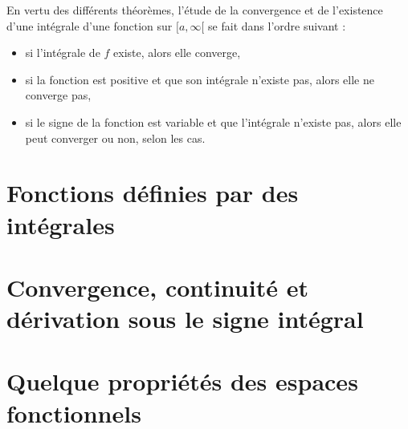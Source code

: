En vertu des différents théorèmes, l'étude de la convergence et de l'existence d'une intégrale d'une fonction sur $[a,\infty[$ se fait dans l'ordre suivant :
\begin{itemize}
\item si l'intégrale de $f$ existe, alors elle converge,
\item si la fonction est positive et que son intégrale n'existe pas, alors elle ne converge pas,
\item si le signe de la fonction est variable et que l'intégrale n'existe pas, alors elle peut converger ou non, selon les cas.
\end{itemize}

	
					\section{Fonctions définies par des intégrales}



					\section{Convergence, continuité et dérivation sous le signe intégral}

					\section{Quelque propriétés des espaces fonctionnels}


